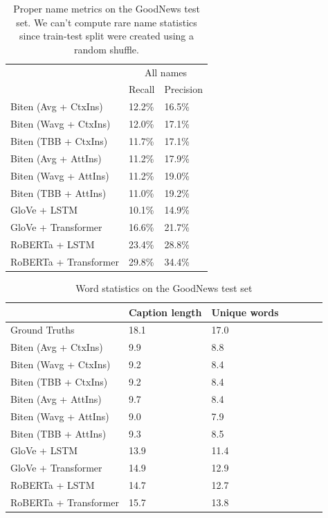 \documentclass[10pt,twocolumn,letterpaper]{article}
\begin{document}
\begin{table}[t]
   \caption {Proper name metrics on the GoodNews test set. We can't compute rare name statistics
   since train-test split were created using a random shuffle.}
	\label{tab:results-names}
	\centering
	\begin{tabular}{lll}
		\toprule
        & \multicolumn{2}{c}{All names}  \\
        & Recall  & Precision \\
      \midrule
      Biten (Avg + CtxIns) \cite{Biten2019GoodNews} & 12.2\% & 16.5\% \\
      Biten (Wavg + CtxIns) \cite{Biten2019GoodNews} & 12.0\% & 17.1\% \\
      Biten (TBB + CtxIns) \cite{Biten2019GoodNews} & 11.7\% & 17.1\% \\
      Biten (Avg + AttIns) \cite{Biten2019GoodNews} & 11.2\% & 17.9\% \\
      Biten (Wavg + AttIns) \cite{Biten2019GoodNews} & 11.2\% & 19.0\% \\
      Biten (TBB + AttIns) \cite{Biten2019GoodNews} & 11.0\% & 19.2\% \\
      \midrule
      GloVe + LSTM & 10.1\% & 14.9\%  \\
      GloVe + Transformer & 16.6\% & 21.7\% \\
      RoBERTa + LSTM & 23.4\% & 28.8\%  \\
      RoBERTa + Transformer & 29.8\% & 34.4\%  \\
		\bottomrule
	\end{tabular}
\end{table}

\begin{table}[t]
	\caption {Word statistics on the GoodNews test set}
	\label{tab:results-stats}
	\centering
	\begin{tabular}{lllllll}
		\toprule
        & Caption length  & Unique words \\
      \midrule
      Ground Truths & 18.1 & 17.0 \\
      \midrule
      Biten (Avg + CtxIns) \cite{Biten2019GoodNews}  & 9.9 & 8.8 \\
      Biten (Wavg + CtxIns) \cite{Biten2019GoodNews}  & 9.2 & 8.4 \\
      Biten (TBB + CtxIns) \cite{Biten2019GoodNews}  & 9.2 & 8.4 \\
      Biten (Avg + AttIns) \cite{Biten2019GoodNews}  & 9.7 & 8.4 \\
      Biten (Wavg + AttIns) \cite{Biten2019GoodNews}  & 9.0 & 7.9 \\
      Biten (TBB + AttIns) \cite{Biten2019GoodNews}  & 9.3 & 8.5 \\
      \midrule
      GloVe + LSTM & 13.9 & 11.4 \\
      GloVe + Transformer & 14.9 & 12.9 \\
      RoBERTa + LSTM & 14.7 & 12.7  \\
      RoBERTa + Transformer & 15.7 & 13.8 \\
		\bottomrule
	\end{tabular}
\end{table}
\end{document}

